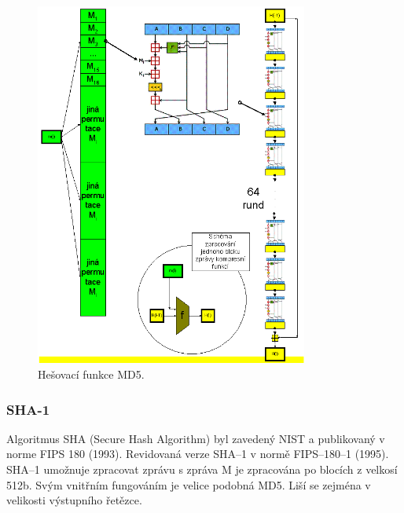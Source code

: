 
\begin{figure}[!ht]
	\centering
 	\includegraphics[width=0.8\textwidth, angle=0]{hesla-md5.png}
 	\caption[Hesla a hešovací funkce MD5]{Hešovací funkce MD5.}\label{fig:md5}
\end{figure}

\subsubsection{SHA-1}

Algoritmus SHA (Secure Hash Algorithm) byl zavedený NIST a publikovaný v norme FIPS 180 (1993). Revidovaná verze SHA–1 v normě FIPS–180–1 (1995). SHA–1 umožnuje zpracovat zprávu s %
zpráva M je zpracována po blocích z velkosí 512b. Svým vnitřním fungováním je velice podobná MD5. Liší se zejména v velikosti výstupního řetězce. 

